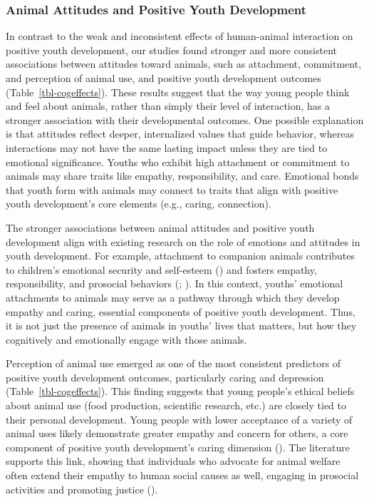 \documentclass[
  jou,
  longtable,
  nolmodern,
  notxfonts,
  notimes,
  colorlinks=true,linkcolor=blue,citecolor=blue,urlcolor=blue]{apa7}
\begin{document}
\subsubsection{Animal Attitudes and Positive Youth
Development}\label{animal-attitudes-and-positive-youth-development-1}

In contrast to the weak and inconsistent effects of human-animal
interaction on positive youth development, our studies found stronger
and more consistent associations between attitudes toward animals, such
as attachment, commitment, and perception of animal use, and positive
youth development outcomes (Table~\ref{tbl-cogeffects}). These results
suggest that the way young people think and feel about animals, rather
than simply their level of interaction, has a stronger association with
their developmental outcomes. One possible explanation is that attitudes
reflect deeper, internalized values that guide behavior, whereas
interactions may not have the same lasting impact unless they are tied
to emotional significance. Youths who exhibit high attachment or
commitment to animals may share traits like empathy, responsibility, and
care. Emotional bonds that youth form with animals may connect to traits
that align with positive youth development's core elements (e.g.,
caring, connection).

The stronger associations between animal attitudes and positive youth
development align with existing research on the role of emotions and
attitudes in youth development. For example, attachment to companion
animals contributes to children's emotional security and self-esteem
() and fosters empathy,
responsibility, and prosocial behaviors
(;
). In this context, youths'
emotional attachments to animals may serve as a pathway through which
they develop empathy and caring, essential components of positive youth
development. Thus, it is not just the presence of animals in youths'
lives that matters, but how they cognitively and emotionally engage with
those animals.

Perception of animal use emerged as one of the most consistent
predictors of positive youth development outcomes, particularly caring
and depression (Table~\ref{tbl-cogeffects}). This finding suggests that
young people's ethical beliefs about animal use (food production,
scientific research, etc.) are closely tied to their personal
development. Young people with lower acceptance of a variety of animal
uses likely demonstrate greater empathy and concern for others, a core
component of positive youth development's caring dimension
(). The literature supports
this link, showing that individuals who advocate for animal welfare
often extend their empathy to human social causes as well, engaging in
prosocial activities and promoting justice
().
\end{document}
